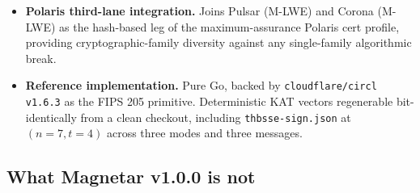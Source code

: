 \begin{itemize}[leftmargin=2em,nosep]
  \item \textbf{Polaris third-lane integration.} Joins Pulsar
        (M-LWE) and Corona (M-LWE) as the hash-based leg of the
        maximum-assurance Polaris cert profile, providing
        cryptographic-family diversity against any single-family
        algorithmic break.
  \item \textbf{Reference implementation.} Pure Go, backed by
        \texttt{cloudflare/circl v1.6.3} \cite{circl} as the
        FIPS 205 primitive. Deterministic KAT vectors regenerable
        bit-identically from a clean checkout, including
        \texttt{thbsse-sign.json} at $(n=7, t=4)$ across three
        modes and three messages.
\end{itemize}

\subsection{What Magnetar v1.0.0 is not}
\label{sec:conclusion:not}

